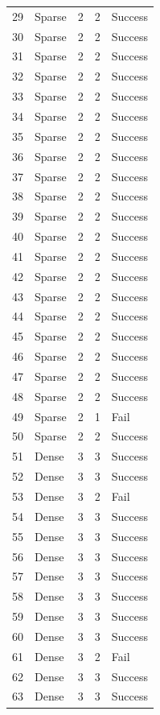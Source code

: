 \documentclass[../main.tex]{subfiles}
\begin{document}
\begin{center}
\begin{longtable}{|c|l|c|c|l|}
    29 & Sparse & 2 & 2 & Success \\
    30 & Sparse & 2 & 2 & Success \\
    31 & Sparse & 2 & 2 & Success \\
    32 & Sparse & 2 & 2 & Success \\
    33 & Sparse & 2 & 2 & Success \\
    34 & Sparse & 2 & 2 & Success \\
    35 & Sparse & 2 & 2 & Success \\
    36 & Sparse & 2 & 2 & Success \\
    37 & Sparse & 2 & 2 & Success \\
    38 & Sparse & 2 & 2 & Success \\
    39 & Sparse & 2 & 2 & Success \\
    40 & Sparse & 2 & 2 & Success \\
    41 & Sparse & 2 & 2 & Success \\
    42 & Sparse & 2 & 2 & Success \\
    43 & Sparse & 2 & 2 & Success \\
    44 & Sparse & 2 & 2 & Success \\
    45 & Sparse & 2 & 2 & Success \\
    46 & Sparse & 2 & 2 & Success \\
    47 & Sparse & 2 & 2 & Success \\
    48 & Sparse & 2 & 2 & Success \\
    49 & Sparse & 2 & 1 & Fail \\
    50 & Sparse & 2 & 2 & Success \\
    51 & Dense & 3 & 3 & Success \\
    52 & Dense & 3 & 3 & Success \\
    53 & Dense & 3 & 2 & Fail \\
    54 & Dense & 3 & 3 & Success \\
    55 & Dense & 3 & 3 & Success \\
    56 & Dense & 3 & 3 & Success \\
    57 & Dense & 3 & 3 & Success \\
    58 & Dense & 3 & 3 & Success \\
    59 & Dense & 3 & 3 & Success \\
    60 & Dense & 3 & 3 & Success \\
    61 & Dense & 3 & 2 & Fail \\
    62 & Dense & 3 & 3 & Success \\
    63 & Dense & 3 & 3 & Success \\

\end{longtable}
\end{center}
\end{document}
